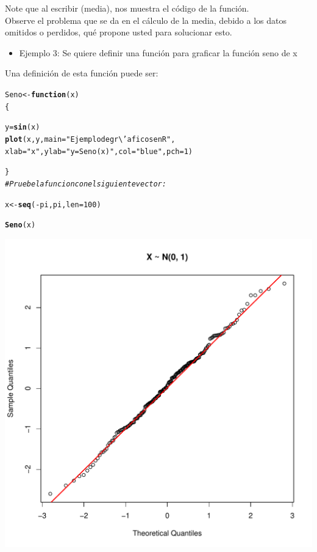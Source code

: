\documentclass[12pt,letterpaper]{article}\usepackage[]{graphicx}\usepackage[]{color}
\makeatletter
\def\maxwidth{ %
  \ifdim\Gin@nat@width>\linewidth
    \linewidth
  \else
    \Gin@nat@width
  \fi
}
\newcommand{\hlnum}[1]{\textcolor[rgb]{0.686,0.059,0.569}{#1}}%
\newcommand{\hlstr}[1]{\textcolor[rgb]{0.192,0.494,0.8}{#1}}%
\newcommand{\hlcom}[1]{\textcolor[rgb]{0.678,0.584,0.686}{\textit{#1}}}%
\newcommand{\hlopt}[1]{\textcolor[rgb]{0,0,0}{#1}}%
\newcommand{\hlstd}[1]{\textcolor[rgb]{0.345,0.345,0.345}{#1}}%
\newcommand{\hlkwa}[1]{\textcolor[rgb]{0.161,0.373,0.58}{\textbf{#1}}}%
\newcommand{\hlkwb}[1]{\textcolor[rgb]{0.69,0.353,0.396}{#1}}%
\newcommand{\hlkwc}[1]{\textcolor[rgb]{0.333,0.667,0.333}{#1}}%
\newcommand{\hlkwd}[1]{\textcolor[rgb]{0.737,0.353,0.396}{\textbf{#1}}}%
\newenvironment{kframe}{%
 \def\at@end@of@kframe{}%
 \ifinner\ifhmode%
  \def\at@end@of@kframe{\end{minipage}}%
  \begin{minipage}{\columnwidth}%
 \fi\fi%
 \def\FrameCommand##1{\hskip\@totalleftmargin \hskip-\fboxsep
 \colorbox{shadecolor}{##1}\hskip-\fboxsep
     \hskip-\linewidth \hskip-\@totalleftmargin \hskip\columnwidth}%
 \MakeFramed {\advance\hsize-\width
   \@totalleftmargin\z@ \linewidth\hsize
   \@setminipage}}%
 {\par\unskip\endMakeFramed%
 \at@end@of@kframe}
\newenvironment{knitrout}{}{} %
\makeatother
\begin{document}
Note que al escribir (media), nos muestra el c\'odigo de la funci\'on.\\

Observe el problema que se da en el c\'alculo de la media, debido a los datos omitidos o perdidos, qu\'e propone usted para solucionar esto.\\ 

\begin{itemize}
\item Ejemplo 3: Se quiere definir una funci\'on para graficar la funci\'on seno de x
\end {itemize}
Una definici\'on de esta funci\'on puede ser:
\begin{knitrout}
\color{fgcolor}\begin{kframe}
\begin{alltt}
\hlstd{Seno} \hlkwb{<-} \hlkwa{function}\hlstd{(}\hlkwc{x}\hlstd{)}
\hlstd{\{}

  \hlstd{y} \hlkwb{=} \hlkwd{sin}\hlstd{(x)}
\hlkwd{plot}\hlstd{(x, y,} \hlkwc{main}\hlstd{=}\hlstr{"Ejemplo de gr\textbackslash{}'aficos en R"}\hlstd{,}
\hlkwc{xlab}\hlstd{=}\hlstr{"x"}\hlstd{,} \hlkwc{ylab}\hlstd{=}\hlstr{"y = Seno(x)"}\hlstd{,} \hlkwc{col}\hlstd{=}\hlstr{"blue"}\hlstd{,} \hlkwc{pch}\hlstd{=}\hlnum{1}\hlstd{)}

\hlstd{\}}
\hlcom{# Pruebe la funcion con el siguiente vector:}

\hlstd{x}\hlkwb{<-}\hlkwd{seq}\hlstd{(}\hlopt{-}\hlstd{pi, pi,} \hlkwc{len}\hlstd{=}\hlnum{100}\hlstd{)}

\hlkwd{Seno}\hlstd{(x)}
\end{alltt}
\end{kframe}
\includegraphics[width=\maxwidth]{figure/unnamed-chunk-5-1} 

\end{knitrout}
\end{document}
